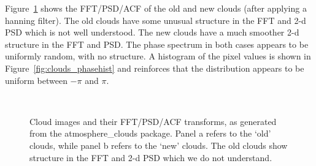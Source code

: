 \documentclass[11pt,preprint]{aastex}
\begin{document}
Figure~\ref{fig:clouds_transforms} shows the FFT/PSD/ACF of the old and new clouds (after applying a hanning filter). The old clouds have some unusual structure in the FFT and 2-d PSD which is not well understood. The new clouds have a much smoother 2-d structure in the FFT and PSD. The phase spectrum in both cases appears to be uniformly random, with no structure. A histogram of the pixel values is shown in Figure~\ref{fig:clouds_phasehist} and reinforces that the distribution appears to be uniform between $-\pi$ and $\pi$. 

\begin{figure}[htbp]
\centering
{} \\
\caption{{\small
Cloud images and their FFT/PSD/ACF transforms, as generated from the atmosphere\_clouds package. Panel a refers to the `old' clouds, while panel b refers to the `new' clouds. The old clouds show structure in the FFT and 2-d PSD which we do not understand.}}
\label{fig:clouds_transforms}
\end{figure}
\end{document}
